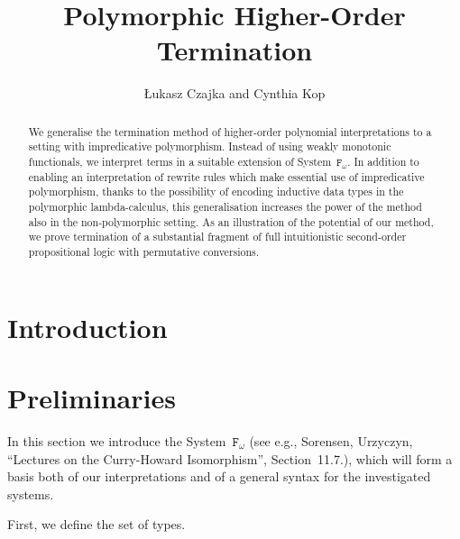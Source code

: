 \documentclass[runningheads,a4paper]{llncs}
\newcommand{\Fomega}{\mathtt{F}_\omega}
\begin{document}
\mainmatter

\title{Polymorphic Higher-Order Termination}

\author{{\L}ukasz Czajka and Cynthia Kop}

\maketitle

\begin{abstract}
  We generalise the termination method of higher-order polynomial
  interpretations to a setting with impredicative
  polymorphism. Instead of using weakly monotonic functionals, we
  interpret terms in a suitable extension of System~$\Fomega$. In
  addition to enabling an interpretation of rewrite rules which make
  essential use of impredicative polymorphism, thanks to the
  possibility of encoding inductive data types in the polymorphic
  lambda-calculus, this generalisation increases the power of the
  method also in the non-polymorphic setting. As an illustration of
  the potential of our method, we prove termination of a substantial
  fragment of full intuitionistic second-order propositional logic
  with permutative conversions.
\end{abstract}

\section{Introduction}

\section{Preliminaries}\label{sec_preliminaries}

In this section we introduce the System~$\Fomega$ (see e.g.,
Sorensen, Urzyczyn, ``Lectures on the Curry-Howard Isomorphism'',
Section~11.7.), which will form a basis both of our interpretations
and of a general syntax for the investigated systems.

First, we define the set of types.
\end{document}
